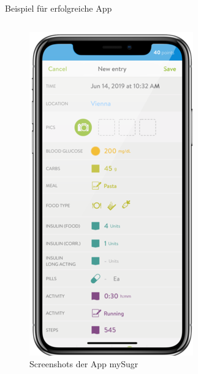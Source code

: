 \documentclass[aspectratio=169,t]{beamer}
\begin{document}
\begin{frame}{Beispiel für erfolgreiche App}
\begin{columns}
\begin{column}{0.6\textwidth}
\begin{figure}
\begin{minipage}{0.33\textwidth}
                    \includegraphics[width=\textwidth]{Bilder/mysugr3.png}
                \end{minipage}
                \vspace{0.1cm}
                \caption{Screenshots der App mySugr \cite{mysugr}}

\end{figure}
\end{column}
\end{columns}
\end{frame}
\end{document}
